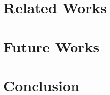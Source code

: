 \documentclass[10pt,sigconf,letterpaper,anonymous,nonacm]{acmart}
\begin{document}


\section{Related Works}

\section{Future Works}

\section{Conclusion}



\end{document}
